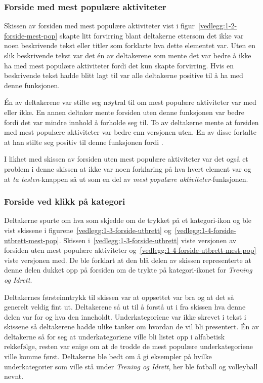 \subsubsection{Forside med mest populære aktiviteter}
Skissen av forsiden med mest populære aktiviteter vist i figur~\ref{vedlegg:1-2-forside-mest-pop} skapte litt forvirring blant deltakerne ettersom det ikke var noen beskrivende tekst eller titler som forklarte hva dette elementet var. Uten en slik beskrivende tekst var det én av deltakerene som mente det var bedre å ikke ha med mest populære aktiviteter fordi det kun skapte forvirring. Hvis en beskrivende tekst hadde blitt lagt til var alle deltakerne positive til å ha med denne funksjonen. 

Én av deltakerene var stilte seg nøytral til om mest populære aktiviteter var med eller ikke. En annen deltaker mente forsiden uten denne funksjonen var bedre fordi det var mindre innhold å forholde seg til. To av deltakerne mente at forsiden med mest populære aktiviteter var bedre enn versjonen uten. En av disse fortalte at han stilte seg positiv til denne funksjonen fordi .

I likhet med skissen av forsiden uten mest populære aktiviteter var det også et problem i denne skissen at ikke var noen forklaring på hva hvert element var og at {\em  ta testen}-knappen så ut som en del av {\em  mest populære aktiviteter}-funksjonen. 

\subsubsection{Forside ved klikk på kategori}
Deltakerne spurte om hva som skjedde om de trykket på et kategori-ikon og ble vist skissene i figurene~\ref{vedlegg:1-3-forside-utbrett} og~\ref{vedlegg:1-4-forside-utbrett-mest-pop}. Skissen i~\ref{vedlegg:1-3-forside-utbrett} viste versjonen av forsiden uten mest populære aktiviteter og~\ref{vedlegg:1-4-forside-utbrett-mest-pop} viste versjonen med. De ble forklart at den blå delen av skissen representerte at denne delen dukket opp på forsiden om de trykte på kategori-ikonet for {\em  Trening og Idrett}.

Deltakernes førsteinntrykk til skissen var at oppsettet var bra og at det så generelt veldig fint ut. Deltakerene så ut til å forstå ut i fra skissen hva denne delen var for og hva den inneholdt. Underkategoriene var ikke skrevet i tekst i skissene så deltakerene hadde ulike tanker om hvordan de vil bli presentert. Én av deltakerne så for seg at underkategoriene ville bli listet opp i alfabetisk rekkefølge, resten var enige om at de trodde de mest populære underkategoriene ville komme først. Deltakerne ble bedt om å gi eksempler på hvilke underkategorier som ville stå under {\em  Trening og Idrett}, her ble fotball og volleyball nevnt.



